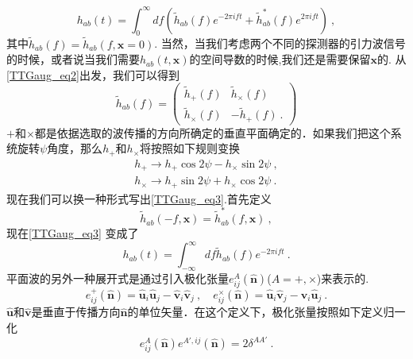 \begin{equation}\label{TTGaug_eq3}
h_{ab} (t) = \int^\infty_0 df ( \tilde h_{ab} (f) e^{-2\pi i f t} + \tilde h^*_{ab} (f) e^{2\pi i f t} ) ~, 
\end{equation}
其中$\tilde h_{ab}(f) = \tilde h_{ab}(f,\mathbf x = 0)$. 当然，当我们考虑两个不同的探测器的引力波信号的时候，或者说当我们需要$h_{ab}(t,\mathbf x)$的空间导数的时候,我们还是需要保留$\mathbf x$的. 从\autoref{TTGaug_eq2}出发，我们可以得到
\begin{equation}
\tilde h_{ab} (f) = 
\begin{pmatrix}
\tilde h_+(f) & \tilde h_{\times} (f) \\
\tilde h_{\times} (f) & -\tilde h_+ (f) ~.
\end{pmatrix}
\end{equation}
$+$和$\times$都是依据选取的波传播的方向所确定的垂直平面确定的．如果我们把这个系统旋转$\psi$角度，那么$h_+$和$h_{\times}$将按照如下规则变换
\begin{equation}
\begin{aligned}
h_+\rightarrow h_+ \cos 2 \psi - h_\times \sin 2 \psi ~, \\
h_\times \rightarrow h_+ \sin 2 \psi + h_\times \cos 2\psi ~.
\end{aligned}
\end{equation}
现在我们可以换一种形式写出\autoref{TTGaug_eq3}.首先定义
\begin{equation}
\tilde h_{ab} (-f,\mathbf x) = \tilde h^*_{ab} (f,\mathbf x) ~,
\end{equation}
现在\autoref{TTGaug_eq3} 变成了
\begin{equation}
h_{ab} (t) = \int_{-\infty}^{\infty} df \tilde h_{ab} (f) e^{-2\pi i f t}~. 
\end{equation}
平面波的另外一种展开式是通过引入极化张量$e^A_{ij}(\hat{ {\mathbf n} })$($A = +,\times$)来表示的. 
\begin{equation}
e^+_{ij} (\hat{ {\mathbf n} }) = \hat{{\mathbf u} }_i \hat{{\mathbf u} }_j - \hat{{\mathbf v} }_i \hat{{\mathbf v} }_j~, \quad e^\times_{ij} (\hat{ {\mathbf n} }) = \hat{{\mathbf u} }_i \hat{{\mathbf v} }_j - \hat{{\mathbf v} }_i \hat{{\mathbf u} }_j ~.
\end{equation}
$\hat{ {\mathbf u} }$和$\hat{ {\mathbf v} }$是垂直于传播方向$\hat{  {\mathbf n}  }$的单位矢量．在这个定义下，极化张量按照如下定义归一化
\begin{equation}
e^A_{ij}(\hat{ {\mathbf n} }) e^{A',ij} (\hat{ {\mathbf n} }) = 2 \delta^{AA'} ~.  
\end{equation}
